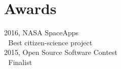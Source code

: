 \documentclass[]{resume}
\begin{document}
\begin{minipage}[t]{0.33\textwidth}

\section{Awards} 
2016, NASA SpaceApps \\ $\;$\textbullet{} Best citizen-science project  \\
\vspace{0.15cm}
2015, Open Source Software Contest \\ $\;$\textbullet{} Finalist  

%
%

\end{minipage} 
\hfill
\end{document}
